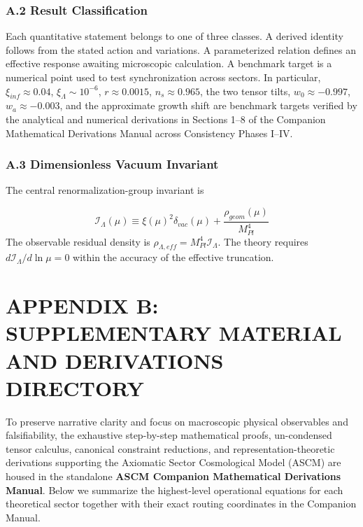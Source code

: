 \documentclass[aps,prd,onecolumn,superscriptaddress,nofootinbib,longbibliography,10pt]{revtex4-2}
\begin{document}
  
\subsubsection*{A.2 Result Classification}

  Each quantitative statement belongs to one of three classes. A derived identity follows from the stated action and variations. A parameterized relation defines an effective response awaiting microscopic calculation. A benchmark target is a numerical point used to test synchronization across sectors. In particular, \(\xi_{inf} \approx 0.04\), \(\xi_\Lambda \sim 10^{-6}\), \(r \approx 0.0015\), \(n_s \approx 0.965\), the two tensor tilts, \(w_0 \approx -0.997\), \(w_a \approx -0.003\), and the approximate growth shift are benchmark targets verified by the analytical and numerical derivations in Sections 1–8 of the Companion Mathematical Derivations Manual across Consistency Phases I–IV.


  
\subsubsection*{A.3 Dimensionless Vacuum Invariant}

  The central renormalization-group invariant is


  \[ \mathcal{I}_\Lambda(\mu) \equiv \xi(\mu)^2 \delta_{vac}(\mu) + \frac{\rho_{geom}(\mu)}{M_{Pl}^4} \]
  The observable residual density is \(\rho_{\Lambda,eff} = M_{Pl}^4 \mathcal{I}_\Lambda\). The theory requires \(d\mathcal{I}_\Lambda/d\ln\mu = 0\) within the accuracy of the effective truncation.




 

  
\section*{APPENDIX B: SUPPLEMENTARY MATERIAL AND DERIVATIONS DIRECTORY}

  To preserve narrative clarity and focus on macroscopic physical observables and falsifiability, the exhaustive step-by-step mathematical proofs, un-condensed tensor calculus, canonical constraint reductions, and representation-theoretic derivations supporting the Axiomatic Sector Cosmological Model (ASCM) are housed in the standalone \textbf{ASCM Companion Mathematical Derivations Manual}. Below we summarize the highest-level operational equations for each theoretical sector together with their exact routing coordinates in the Companion Manual.
\end{document}
